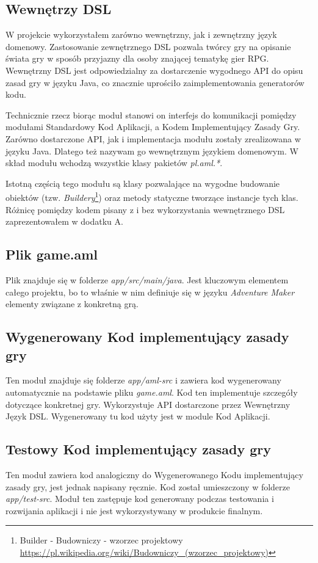 \documentclass[openright]{xmgr}
\begin{document}
\subsection*{Wewnętrzy DSL}

W projekcie wykorzystałem zarówno wewnętrzny, jak i zewnętrzny język domenowy. Zastosowanie zewnętrznego DSL pozwala twórcy gry na opisanie świata gry w sposób przyjazny dla osoby znającej tematykę gier RPG.  Wewnętrzny DSL jest odpowiedzialny za dostarczenie wygodnego API do opisu zasad gry w języku Java, co znacznie uprościło zaimplementowania generatorów kodu.

Technicznie rzecz biorąc moduł stanowi on interfejs do komunikacji pomiędzy modułami Standardowy Kod Aplikacji, a Kodem Implementujący Zasady Gry. Zarówno dostarczone API, jak i implementacja modułu zostały zrealizowana w języku Java. Dlatego też nazywam go wewnętrznym językiem domenowym. W skład modułu wchodzą wszystkie klasy pakietów \textit{pl.aml.*}.

Istotną częścią tego modułu są klasy pozwalające na wygodne budowanie obiektów (tzw. \textit{Buildery}\footnote{Builder - Budowniczy  - wzorzec projektowy  \url{https://pl.wikipedia.org/wiki/Budowniczy_(wzorzec_projektowy)}}) oraz metody statyczne tworzące instancje tych klas. Różnicę pomiędzy kodem pisany z i bez wykorzystania wewnętrznego DSL zaprezentowałem w dodatku A.

\subsection*{Plik game.aml}
Plik znajduje się w folderze \textit{app/src/main/java}. Jest kluczowym elementem całego projektu, bo to właśnie w nim definiuje się w języku \textit{Adventure Maker} elementy związane z konkretną grą.

\subsection*{Wygenerowany Kod implementujący zasady gry}
Ten moduł znajduje się folderze \textit{app/aml-src} i zawiera kod wygenerowany automatycznie na podstawie pliku \textit{game.aml}. Kod ten implementuje szczegóły dotyczące konkretnej gry. Wykorzystuje API dostarczone przez Wewnętrzny Język DSL. Wygenerowany tu kod użyty jest w module Kod Aplikacji.

\subsection*{Testowy Kod implementujący zasady gry}
Ten moduł zawiera kod analogiczny do Wygenerowanego Kodu implementujący zasady gry, jest jednak napisany ręcznie. Kod został umieszczony w folderze \textit{app/test-src}. Moduł ten zastępuje kod generowany podczas testowania i rozwijania aplikacji i nie jest wykorzystywany w produkcie finalnym.
\end{document}
